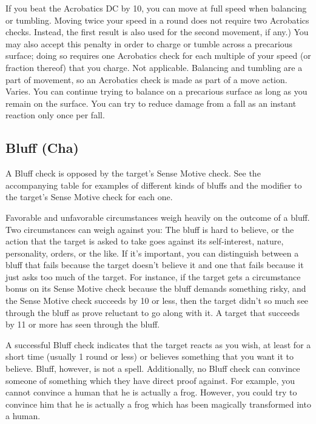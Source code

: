  If you beat the Acrobatics DC by 10, you can move at full speed when balancing or tumbling. Moving twice your speed in a round does not require two Acrobatics checks. Instead, the first result is also used for the second movement, if any.) You may also accept this penalty in order to charge or tumble across a precarious surface; doing so requires one Acrobatics check for each multiple of your speed (or fraction thereof) that you charge.
 Not applicable. Balancing and tumbling are a part of movement, so an Acrobatics check is made as part of a move action.
 Varies. You can continue trying to balance on a precarious surface as long as you remain on the surface. You can try to reduce damage from a fall as an instant reaction only once per fall.

\subsection{Bluff (Cha)}
 A Bluff check is opposed by the target's Sense Motive check. See the accompanying table for examples of different kinds of bluffs and the modifier to the target's Sense Motive check for each one.

Favorable and unfavorable circumstances weigh heavily on the outcome of a bluff. Two circumstances can weigh against you: The bluff is hard to believe, or the action that the target is asked to take goes against its self-interest, nature, personality, orders, or the like. If it's important, you can distinguish between a bluff that fails because the target doesn't believe it and one that fails because it just asks too much of the target. For instance, if the target gets a  circumstance bonus on its Sense Motive check because the bluff demands something risky, and the Sense Motive check succeeds by 10 or less, then the target didn't so much see through the bluff as prove reluctant to go along with it. A target that succeeds by 11 or more has seen through the bluff.

A successful Bluff check indicates that the target reacts as you wish, at least for a short time (usually 1 round or less) or believes something that you want it to believe. Bluff, however, is not a  spell. Additionally, no Bluff check can convince someone of something which they have direct proof against. For example, you cannot convince a human that he is actually a frog. However, you could try to convince him that he is actually a frog which has been magically transformed into a human.


